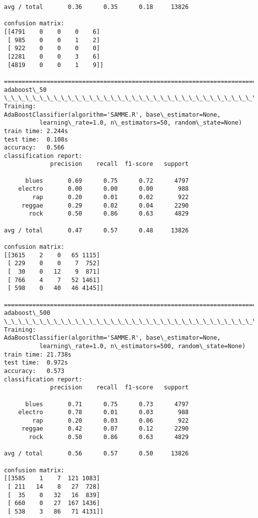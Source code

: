 \documentclass[11pt]{article}
\begin{document}
\begin{Verbatim}[commandchars=\\\{\}]
avg / total       0.36      0.35      0.18     13826

confusion matrix:
[[4791    0    0    0    6]
 [ 985    0    0    1    2]
 [ 922    0    0    0    0]
 [2281    0    0    3    6]
 [4819    0    0    1    9]]

================================================================================
adaboost\_50
\_\_\_\_\_\_\_\_\_\_\_\_\_\_\_\_\_\_\_\_\_\_\_\_\_\_\_\_\_\_\_\_\_\_\_\_\_\_\_\_\_\_\_\_\_\_\_\_\_\_\_\_\_\_\_\_\_\_\_\_\_\_\_\_\_\_\_\_\_\_\_\_\_\_\_\_\_\_\_\_
Training: 
AdaBoostClassifier(algorithm='SAMME.R', base\_estimator=None,
          learning\_rate=1.0, n\_estimators=50, random\_state=None)
train time: 2.244s
test time:  0.108s
accuracy:   0.566
classification report:
             precision    recall  f1-score   support

      blues       0.69      0.75      0.72      4797
    electro       0.00      0.00      0.00       988
        rap       0.20      0.01      0.02       922
     reggae       0.29      0.02      0.04      2290
       rock       0.50      0.86      0.63      4829

avg / total       0.47      0.57      0.48     13826

confusion matrix:
[[3615    2    0   65 1115]
 [ 229    0    0    7  752]
 [  30    0   12    9  871]
 [ 766    4    7   52 1461]
 [ 598    0   40   46 4145]]

================================================================================
adaboost\_500
\_\_\_\_\_\_\_\_\_\_\_\_\_\_\_\_\_\_\_\_\_\_\_\_\_\_\_\_\_\_\_\_\_\_\_\_\_\_\_\_\_\_\_\_\_\_\_\_\_\_\_\_\_\_\_\_\_\_\_\_\_\_\_\_\_\_\_\_\_\_\_\_\_\_\_\_\_\_\_\_
Training: 
AdaBoostClassifier(algorithm='SAMME.R', base\_estimator=None,
          learning\_rate=1.0, n\_estimators=500, random\_state=None)
train time: 21.738s
test time:  0.972s
accuracy:   0.573
classification report:
             precision    recall  f1-score   support

      blues       0.71      0.75      0.73      4797
    electro       0.78      0.01      0.03       988
        rap       0.20      0.03      0.06       922
     reggae       0.42      0.07      0.12      2290
       rock       0.50      0.86      0.63      4829

avg / total       0.56      0.57      0.50     13826

confusion matrix:
[[3585    1    7  121 1083]
 [ 211   14    8   27  728]
 [  35    0   32   16  839]
 [ 660    0   27  167 1436]
 [ 538    3   86   71 4131]]


\end{Verbatim}
\end{document}

